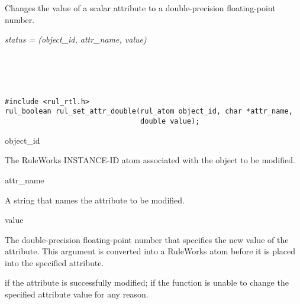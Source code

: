 \begin{seealso}



\end{seealso}

\section*{}

Changes the value of a scalar attribute to a double-precision
floating-point number.

\Syntax

\it{status} = (\it{object\_id},
\it{attr\_name}, \it{value})

\begin{args}
   \\
   \\
   \\
\end{args}

\CBinding
\begin{verbatim}
#include <rul_rtl.h>
rul_boolean rul_set_attr_double(rul_atom object_id, char *attr_name,
                                double value);
\end{verbatim}

\begin{arguments}
\item[object\_id]

  The RuleWorks INSTANCE-ID atom associated with the object to be
  modified.

\item[attr\_name]

  A string that names the attribute to be modified.
   
\item[value]

  The double-precision floating-point number that specifies the new
  value of the attribute. This argument is converted into a RuleWorks
   atom before it is placed into the specified attribute.
\end{arguments}

\ReturnValue

 if the attribute is successfully modified;  if the
function is unable to change the specified attribute value for any
reason.


